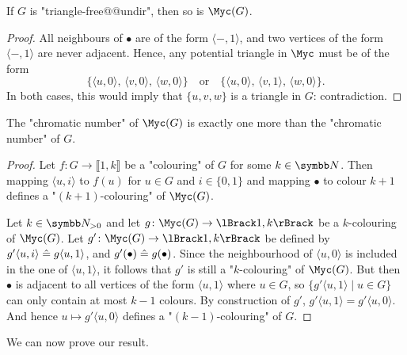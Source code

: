 \begin{fact}
  \label{fact:triangle-free}
  If $G$ is "triangle-free@@undir", then so is $\Myc(G)$.
\end{fact}

\begin{proof}
  All neighbours of $\bullet$ are of the form $\langle -, 1\rangle$,
  and two vertices of the form $\langle -, 1\rangle$ are never adjacent.
  Hence, any potential triangle in $\Myc$ must be of the form
  \[
    \{
      \langle u, 0 \rangle,\,
      \langle v, 0 \rangle,\,
      \langle w, 0 \rangle
    \}
    \quad\text{or}\quad
    \{
      \langle u, 0 \rangle,\,
      \langle v, 1 \rangle,\,
      \langle w, 0 \rangle
    \}.
  \]
  In both cases, this would imply that $\{u,v,w\}$ is a triangle in $G$:
  contradiction.
\end{proof}

\begin{fact}
  \label{fact:chromatic-number}
  The "chromatic number" of $\Myc(G)$
  is exactly one more than the "chromatic number" of $G$.
\end{fact}

\begin{proof}
  Let $f\colon G \to \lBrack 1,k \rBrack$ be a "colouring" of $G$ for some $k\in \N$.
  Then mapping $\langle u, i \rangle$ to $f(u)$ for $u \in G$ and $i \in \{0,1\}$
  and mapping $\bullet$ to colour $k+1$ defines a "$(k+1)$-colouring" of $\Myc(G)$.

  Let $k \in \Np$ and let $g\colon \Myc(G) \to \lBrack 1,k\rBrack$ be a
  $k$-colouring of $\Myc(G)$.
  Let $g'\colon \Myc(G) \to \lBrack 1,k\rBrack$
  be defined by $g'\langle u,i\rangle \mathrel{\hat{=}} g\langle u,1 \rangle$,
  and $g'(\bullet) \mathrel{\hat{=}} g(\bullet)$.
  Since the neighbourhood of $\langle u,0 \rangle$ is included in the
  one of $\langle u,1 \rangle$, it follows that $g'$ is still a "$k$-colouring"
  of $\Myc(G)$. But then $\bullet$ is adjacent to all vertices of the form $\langle u, 1\rangle$
  where $u\in G$, so $\{g'\langle u, 1\rangle \mid u \in G\}$ can only contain at most $k-1$ colours.
  By construction of $g'$, $g'\langle u, 1\rangle = g'\langle u, 0\rangle$.
  And hence $u \mapsto g' \langle u,0 \rangle$ defines a "$(k-1)$-colouring" of $G$.
\end{proof}

We can now prove our result.


